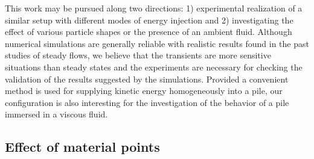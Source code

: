 This work may be pursued along two directions: 1) experimental 
realization of a similar setup with different modes of energy injection and 
2) investigating the effect of various particle shapes or the presence of an 
ambient fluid. Although numerical simulations are generally reliable 
with realistic results found in the past studies of steady flows, we believe 
that the transients are more sensitive situations than steady states and the  
experiments are necessary for checking the validation of the results suggested 
by the simulations. Provided a convenient method is used for supplying kinetic 
energy homogeneously into a pile, our configuration is also interesting for 
the investigation of the behavior of a pile immersed in a viscous 
fluid.

\subsection{Effect of material points}
\label{sec:MPM_points_per_cell}
